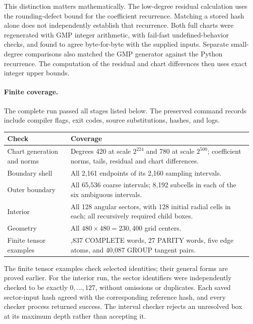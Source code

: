 This distinction matters mathematically.  The low-degree residual calculation
uses the rounding-defect bound for the coefficient recurrence.  Matching a
stored hash alone does not independently establish that recurrence.  Both full
charts were regenerated with GMP integer arithmetic, with fail-fast
undefined-behavior checks, and found to agree
byte-for-byte with the supplied inputs.  Separate small-degree comparisons also
matched the GMP generator against the Python recurrence.  The computation of
the residual and chart differences then uses exact integer upper bounds.

\paragraph{Finite coverage.}
The complete run passed all stages listed below.  The preserved command records
include compiler flags, exit codes, source substitutions, hashes, and logs.
\begin{center}
\begin{tabular}{@{}>{\raggedright\arraybackslash}p{.29\linewidth}>{\raggedright\arraybackslash}p{.65\linewidth}@{}}
\toprule
Check & Coverage \\
\midrule
Chart generation and norms & Degrees 420 at scale $2^{224}$ and 780 at scale
$2^{500}$; coefficient norms, tails, residual and chart differences. \\
Boundary shell & All 2,161 endpoints of its 2,160 sampling intervals. \\
Outer boundary & All 65,536 coarse intervals; 8,192 subcells in each of the
six ambiguous intervals. \\
Interior & All 128 angular sectors, with 128 initial radial cells in each;
all recursively required child boxes. \\
Geometry & All $480\times480=230{,}400$ grid centers. \\
Finite tensor examples & 9,837 COMPLETE words, 27 PARITY words, five edge
atoms, and 40,087 GROUP tangent pairs. \\
\bottomrule
\end{tabular}
\end{center}
The finite tensor examples check selected identities; their general forms are
proved earlier.  For the interior run, the sector identifiers were independently
checked to be exactly $0,\ldots,127$, without omissions or duplicates.  Each saved
sector-input hash agreed with the corresponding reference hash, and every
checker process returned success.  The interval checker rejects an unresolved
box at its maximum depth rather than accepting it.

